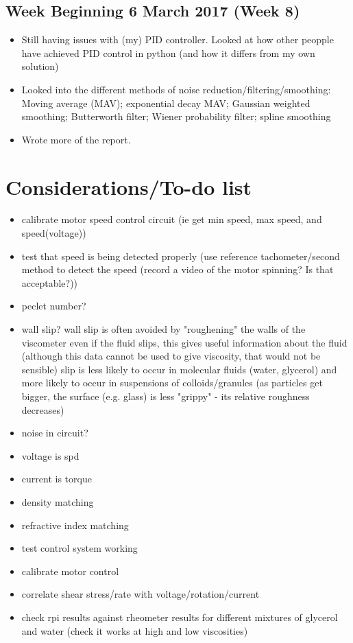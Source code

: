 \documentclass[a4]{report}
\def\mon{\subsection*{Monday}}
\begin{document}
	\section{Week Beginning 6 March 2017 (Week 8)}
	\begin{itemize}
		\mon
		\item Still having issues with (my) PID controller. Looked at how other peopple have achieved PID control in python (and how it differs from my own solution)
		\item Looked into the different methods of noise reduction/filtering/smoothing:
		\subitem Moving average (MAV); exponential decay MAV; Gaussian weighted smoothing; 
		\subitem Butterworth filter; Wiener probability filter; spline smoothing
		\item Wrote more of the report.
	\end{itemize}
	\newpage
	\chapter{Considerations/To-do list}
	\begin{itemize}
		\item calibrate motor speed control circuit (ie get min speed, max speed, and speed(voltage))
		\item test that speed is being detected properly (use reference tachometer/second method to detect the speed (record a video of the motor spinning? Is that acceptable?))
		\item peclet number?
		\item wall slip?
		\subitem wall slip is often avoided by "roughening" the walls of the viscometer
		\subitem even if the fluid slips, this gives useful information about the fluid (although this data cannot be used to give viscosity, that would not be sensible)
		\subitem slip is less likely to occur in molecular fluids (water, glycerol) and more likely to occur in suspensions of colloids/granules (as particles get bigger, the surface (e.g. glass) is less "grippy" - its relative roughness decreases)
		\item noise in circuit?
		\item voltage is spd
		\item current is torque
		\item density matching
		\item refractive index matching
		\item test control system working
		\item calibrate motor control
		\item correlate shear stress/rate with voltage/rotation/current
		\item check rpi results against rheometer results for different mixtures of glycerol and water (check it works at high and low viscosities)
	\end{itemize}
	
\end{document}

